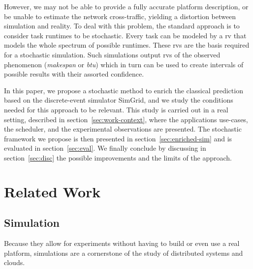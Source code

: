 \documentclass[]{llncs}
\begin{document}
However, we may not be able to provide a fully accurate platform description, or
be unable  to estimate  the network  cross-traffic, yielding  a distortion  between
simulation and reality.  To deal with this problem, the  standard approach is to
consider task runtimes to be stochastic. Every task can be  modeled by a \ac{rv}
that models the whole spectrum of possible runtimes. These \acp{rv} are the basis
required for a stochastic simulation.  Such simulations output \acp{rv}
of the  observed phenomenon (\emph{makespan}  or \emph{\ac{btu}}) which  in turn
can  be  used to  create  intervals  of  possible  results with  their  assorted
confidence.

In this paper, we propose a stochastic method to enrich the classical prediction
based  on the  discrete-event simulator  SimGrid,  and we  study the  conditions
needed for  this approach to be  relevant. This study  is carried out in  a real
setting,  described in  section~\ref{sec:work-context},  where the  applications
use-cases, the scheduler, and the  experimental observations are presented.  The
stochastic     framework     we     propose     is     then     presented     in
section~\ref{sec:enriched-sim}  and is  evaluated in  section~\ref{sec:eval}. We
finally conclude by  discussing in section~\ref{sec:disc} the possible
improvements and the  limits of the approach.


\section{Related Work}

\subsection{Simulation}

Because they allow for experiments without having to build or even use a real 
platform, simulations are a cornerstone of the study of distributed
systems and clouds.  
\end{document}
